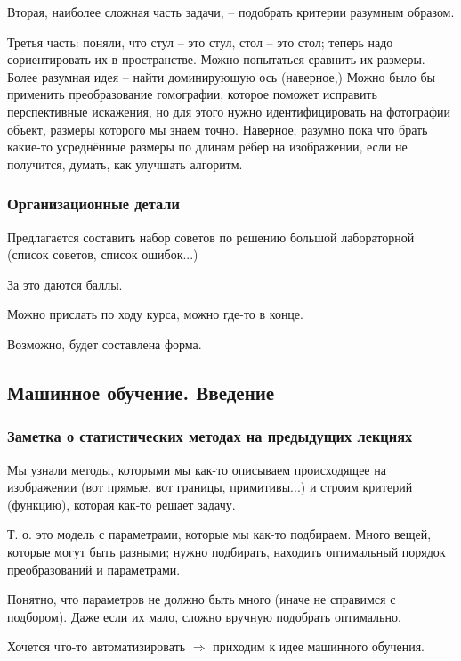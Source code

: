 \documentclass[main.tex]{subfiles}
\begin{document}
Вторая, наиболее сложная часть задачи, -- подобрать критерии разумным образом.

Третья часть: поняли, что стул -- это стул, стол -- это стол; теперь надо сориентировать их в пространстве.
Можно попытаться сравнить их размеры. Более разумная идея -- найти доминирующую ось (наверное,)
Можно было бы применить преобразование гомографии, которое поможет исправить перспективные искажения, но для этого нужно идентифицировать на фотографии объект, размеры которого мы знаем точно.
Наверное, разумно пока что брать какие-то усреднённые размеры по длинам рёбер на изображении, если не получится, думать, как улучшать алгоритм.

\subsubsection{Организационные детали}

Предлагается составить набор советов по решению большой лабораторной (список советов, список ошибок...)

\begin{leftbar}
	За это даются баллы.
	
	Можно прислать по ходу курса, можно где-то в конце.
	
	Возможно, будет составлена форма.
\end{leftbar}

\subsection{Машинное обучение. Введение}

\subsubsection{Заметка о статистических методах на предыдущих лекциях}

Мы узнали методы, которыми мы как-то описываем происходящее на изображении (вот прямые, вот границы, примитивы...) и строим критерий (функцию), которая как-то решает задачу.

Т. о. это модель с параметрами, которые мы как-то подбираем.
Много вещей, которые могут быть разными; нужно подбирать, находить оптимальный порядок преобразований и параметрами.

Понятно, что параметров не должно быть много (иначе не справимся с подбором).
Даже если их мало, сложно вручную подобрать оптимально.

Хочется что-то автоматизировать $ \Rightarrow $ приходим к идее машинного обучения.
\end{document}
